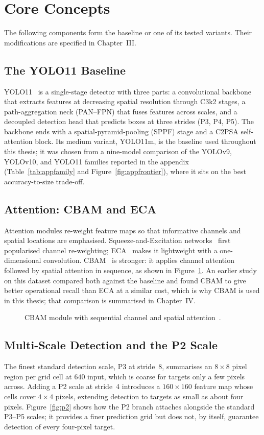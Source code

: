 \section{Core Concepts}
The following components form the baseline or one of its tested variants. Their
modifications are specified in Chapter~III.

\subsection{The YOLO11 Baseline}
YOLO11~\cite{jocher2024yolo11} is a single-stage detector with three parts: a
convolutional backbone that extracts features at decreasing spatial resolution
through C3k2 stages, a path-aggregation neck (PAN--FPN) that fuses features across
scales, and a decoupled detection head that predicts boxes at three strides (P3,
P4, P5). The backbone ends with a spatial-pyramid-pooling (SPPF) stage and a
C2PSA self-attention block. Its medium variant, YOLO11m, is the baseline used
throughout this thesis; it was chosen from a nine-model comparison of the
YOLOv9, YOLOv10, and YOLO11 families reported in the appendix
(Table~\ref{tab:appfamily} and Figure~\ref{fig:appfrontier}), where it sits on
the best accuracy-to-size trade-off.

\subsection{Attention: CBAM and ECA}
Attention modules re-weight feature maps so that informative channels and spatial
locations are emphasised. Squeeze-and-Excitation networks~\cite{hu2018senet} first
popularised channel re-weighting; ECA~\cite{wang2020eca} makes it lightweight with a
one-dimensional convolution. CBAM~\cite{woo2018cbam} is stronger:
it applies channel attention followed by spatial attention in sequence, as shown in
Figure~\ref{fig:cbam}. An earlier study on this dataset compared both against the
baseline and found CBAM to give better operational recall than ECA at a similar
cost, which is why CBAM is used in this thesis; that comparison is summarised in
Chapter~IV.

\begin{figure}[tbp]
  \centering
  \caption{CBAM module with sequential channel and spatial attention~\cite{woo2018cbam}.}
  \label{fig:cbam}
\end{figure}

\subsection{Multi-Scale Detection and the P2 Scale}
The finest standard detection scale, P3 at stride~8, summarises an $8\times8$ pixel
region per grid cell at $640$ input, which is coarse for targets only a few pixels
across. Adding a P2 scale at stride~4 introduces a $160\times160$ feature map whose
cells cover $4\times4$ pixels, extending detection to targets as small as about
four pixels. Figure~\ref{fig:p2} shows how the P2 branch attaches alongside the
standard P3--P5 scales; it provides a finer prediction grid but does not, by
itself, guarantee detection of every four-pixel target.

